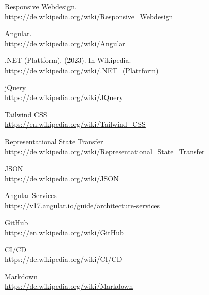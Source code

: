 \documentclass[a4paper,11pt]{article}
\begin{document}
{}

\begin{thebibliography}{99}
   Responsive Webdesign. \\
  \url{https://de.wikipedia.org/wiki/Responsive_Webdesign}
  
   Angular.\\
  \url{https://de.wikipedia.org/wiki/Angular}
  
   .NET (Plattform). (2023). In Wikipedia. \\
  \url{https://de.wikipedia.org/wiki/.NET_(Plattform)}
  
   jQuery \\
  \url{https://de.wikipedia.org/wiki/JQuery}
  
   Tailwind CSS \\
  \url{https://en.wikipedia.org/wiki/Tailwind_CSS}
  
   Representational State Transfer \\
  \url{https://de.wikipedia.org/wiki/Representational_State_Transfer}
  
   JSON\\
  \url{https://de.wikipedia.org/wiki/JSON}
  
   Angular Services \\
  \url{https://v17.angular.io/guide/architecture-services}
  
   GitHub \\
  \url{https://en.wikipedia.org/wiki/GitHub}
  
   CI/CD \\
  \url{https://de.wikipedia.org/wiki/CI/CD}
  
   Markdown \\
  \url{https://de.wikipedia.org/wiki/Markdown}
\end{thebibliography}
\end{document}
